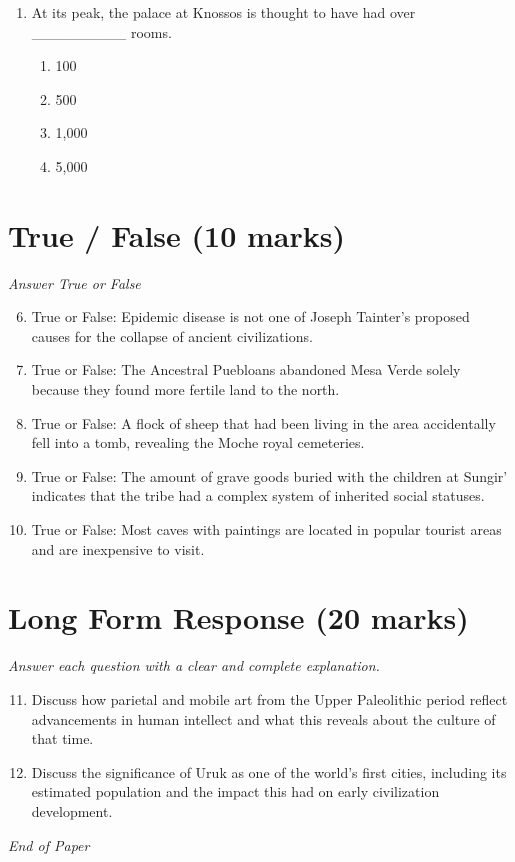 \documentclass[12pt]{article}
\begin{document}
\begin{enumerate}[label=\arabic*.]
\begin{enumerate}[label=(\alph*)]
    \item communal feasts and the torture of captives to be sacrificed.
\end{enumerate}
\item At its peak, the palace at Knossos is thought to have had over \_\_\_\_\_\_\_\_\_ rooms.
\begin{enumerate}[label=(\alph*)]
    \item 100
    \item 500
    \item 1,000
    \item 5,000
\end{enumerate}
\end{enumerate}

\section*{True / False (10 marks)}
\textit{Answer True or False}
\begin{enumerate}[label=\arabic*.]
\setcounter{enumi}{5}
\item True or False: Epidemic disease is not one of Joseph Tainter's proposed causes for the collapse of ancient civilizations.
\item True or False: The Ancestral Puebloans abandoned Mesa Verde solely because they found more fertile land to the north.
\item True or False: A flock of sheep that had been living in the area accidentally fell into a tomb, revealing the Moche royal cemeteries.
\item True or False: The amount of grave goods buried with the children at Sungir' indicates that the tribe had a complex system of inherited social statuses.
\item True or False: Most caves with paintings are located in popular tourist areas and are inexpensive to visit.
\end{enumerate}

\section*{Long Form Response (20 marks)}
\textit{Answer each question with a clear and complete explanation.}
\begin{enumerate}[label=\arabic*.]
\setcounter{enumi}{10}
\item Discuss how parietal and mobile art from the Upper Paleolithic period reflect advancements in human intellect and what this reveals about the culture of that time.
\item Discuss the significance of Uruk as one of the world's first cities, including its estimated population and the impact this had on early civilization development.
\end{enumerate}

\vfill
\noindent\textit{End of Paper}
\end{document}
